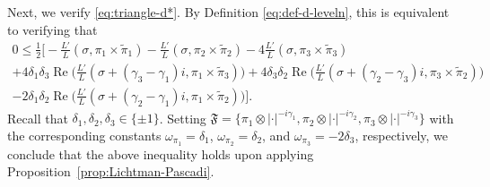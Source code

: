 \documentclass[12pt,reqno]{amsart}
\renewcommand{\tilde}{\widetilde}
\theoremstyle{remark}
\renewcommand{\tilde}{\widetilde}
\DeclareMathOperator{\Real}{Re}
\renewcommand{\tilde}{\widetilde}
\numberwithin{equation}{section}
\begin{document}
    Next, we verify \eqref{eq:triangle-d*}. %
    By Definition \eqref{eq:def-d-leveln}, this is equivalent to verifying that
\begin{multline*}
        0 \le \frac{1}{2}\Big[-\frac{L'}{L}(\sigma, \pi_1 \times\tilde{\pi}_1)  -\frac{L'}{L}(\sigma, \pi_2 \times \tilde{\pi}_2)-4\frac{L'}{L}(\sigma, \pi_3 \times \tilde{\pi}_3)\\
        +4\delta_1{\delta}_3\Real\Big(\frac{L'}{L}(\sigma+(\gamma_3-\gamma_1)i, \pi_1\times \tilde{\pi}_3)\Big)+4\delta_{3}{\delta}_{2}\Real\Big(\frac{L'}{L}(\sigma+(\gamma_{2}-\gamma_3)i, \pi_3 \times \tilde{\pi}_2)\Big)\\
        - 2\delta_1{\delta}_2 \Real\Big(\frac{L'}{L}(\sigma+(\gamma_2-\gamma_1)i, \pi_1 \times \tilde{\pi}_2)\Big)\Big].
\end{multline*}
Recall that $\delta_1, \delta_2, \delta_3 \in \{\pm1\}$. Setting $\mathfrak{F}=\{\pi_1 \otimes |\cdot|^{-i\gamma_1}, \pi_2 \otimes |\cdot|^{-i\gamma_2}, \pi_3 \otimes |\cdot|^{-i\gamma_3}\}$ with the corresponding constants $\omega_{\pi_1} = \delta_{1}$, $\omega_{\pi_2} = \delta_{2}$, and $\omega_{\pi_3} = -2\delta_{3}$, respectively, we conclude that the above inequality holds upon applying Proposition~\ref{prop:Lichtman-Pascadi}.
\end{document}
